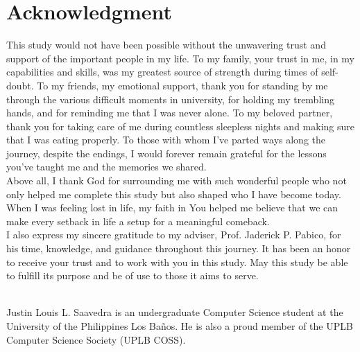 \documentclass[journal]{./IEEE/IEEEtran}
\begin{document}
\section*{Acknowledgment}
This study would not have been possible without the unwavering trust and support of the important people in my life. To my family, your trust in me, in my capabilities and skills, was my greatest source of strength during times of self-doubt. To my friends, my emotional support, thank you for standing by me through the various difficult moments in university, for holding my trembling hands, and for reminding me that I was never alone. To my beloved partner, thank you for taking care of me during countless sleepless nights and making sure that I was eating properly. To those with whom I’ve parted ways along the journey, despite the endings, I would forever remain grateful for the lessons you’ve taught me and the memories we shared. \\

Above all, I thank God for surrounding me with such wonderful people who not only helped me complete this study but also shaped who I have become today. When I was feeling lost in life, my faith in You helped me believe that we can make every setback in life a setup for a meaningful comeback. \\

I also express my sincere gratitude to my adviser, Prof. Jaderick P. Pabico, for his time, knowledge, and guidance throughout this journey. It has been an honor to receive your trust and to work with you in this study. May this study be able to fulfill its purpose and be of use to those it aims to serve.

\printbibliography

\begin{biography}
{\\ Justin Louis L. Saavedra}
is an undergraduate Computer Science student at the University of the Philippines Los Ba\~{n}os. He is also a proud member of the UPLB Computer Science Society (UPLB COSS).
\end{biography}
\end{document}
